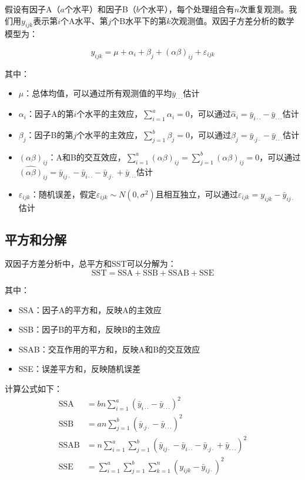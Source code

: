 \documentclass[12pt, a4paper]{amsart}
\begin{document}
假设有因子A（$a$个水平）和因子B（$b$个水平），每个处理组合有$n$次重复观测。我们用$y_{ijk}$表示第$i$个A水平、第$j$个B水平下的第$k$次观测值。双因子方差分析的数学模型为：

$$y_{ijk} = \mu + \alpha_i + \beta_j + (\alpha\beta)_{ij} + \varepsilon_{ijk}$$

其中：
\begin{itemize}
    \item $\mu$：总体均值，可以通过所有观测值的平均$\bar{y}_{\cdot\cdot\cdot}$估计
    \item $\alpha_i$：因子A的第$i$个水平的主效应，$\sum_{i=1}^{a} \alpha_i = 0$，可以通过$\hat{\alpha}_i = \bar{y}_{i\cdot\cdot} - \bar{y}_{\cdot\cdot\cdot}$估计
    \item $\beta_j$：因子B的第$j$个水平的主效应，$\sum_{j=1}^{b} \beta_j = 0$，可以通过$\hat{\beta}_j = \bar{y}_{\cdot j\cdot} - \bar{y}_{\cdot\cdot\cdot}$估计
    \item $(\alpha\beta)_{ij}$：A和B的交互效应，$\sum_{i=1}^{a} (\alpha\beta)_{ij} = \sum_{j=1}^{b} (\alpha\beta)_{ij} = 0$，可以通过$\widehat{(\alpha\beta)}_{ij} = \bar{y}_{ij\cdot} - \bar{y}_{i\cdot\cdot} - \bar{y}_{\cdot j\cdot} + \bar{y}_{\cdot\cdot\cdot}$估计
    \item $\varepsilon_{ijk}$：随机误差，假定$\varepsilon_{ijk} \sim N(0, \sigma^2)$且相互独立，可以通过$\hat{\varepsilon}_{ijk} = y_{ijk} - \bar{y}_{ij\cdot}$估计
\end{itemize}

\subsection{平方和分解}
双因子方差分析中，总平方和SST可以分解为：
$$\text{SST} = \text{SSA} + \text{SSB} + \text{SSAB} + \text{SSE}$$

其中：
\begin{itemize}
    \item SSA：因子A的平方和，反映A的主效应
    \item SSB：因子B的平方和，反映B的主效应
    \item SSAB：交互作用的平方和，反映A和B的交互效应
    \item SSE：误差平方和，反映随机误差
\end{itemize}

计算公式如下：
\begin{align*}
\text{SSA} &= bn\sum_{i=1}^{a} (\bar{y}_{i\cdot\cdot} - \bar{y}_{\cdot\cdot\cdot})^2 \\
\text{SSB} &= an\sum_{j=1}^{b} (\bar{y}_{\cdot j\cdot} - \bar{y}_{\cdot\cdot\cdot})^2 \\
\text{SSAB} &= n\sum_{i=1}^{a}\sum_{j=1}^{b} (\bar{y}_{ij\cdot} - \bar{y}_{i\cdot\cdot} - \bar{y}_{\cdot j\cdot} + \bar{y}_{\cdot\cdot\cdot})^2 \\
\text{SSE} &= \sum_{i=1}^{a}\sum_{j=1}^{b}\sum_{k=1}^{n} (y_{ijk} - \bar{y}_{ij\cdot})^2
\end{align*}
\end{document}

